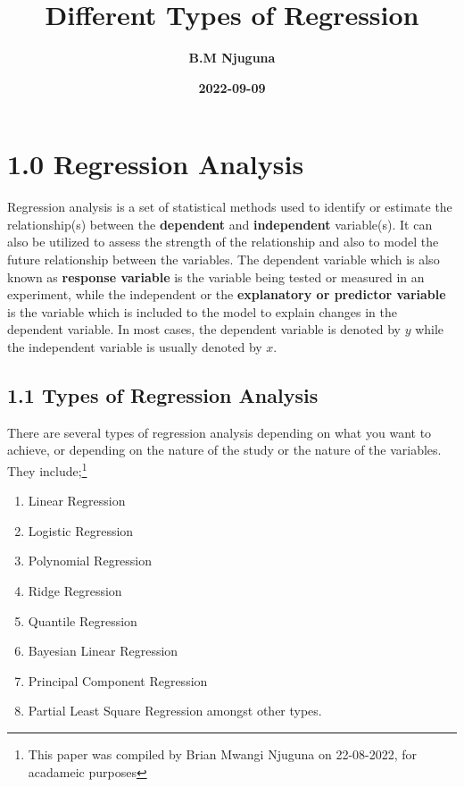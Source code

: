 \documentclass[
]{article}
\title{\textbf{Different Types of Regression}}
\author{\textbf{B.M Njuguna}}
\date{\textbf{2022-09-09}}
\begin{document}
\maketitle

\newpage 
\tableofcontents
\newpage

\hypertarget{regression-analysis}{%
\section{1.0 Regression Analysis}\label{regression-analysis}}

Regression analysis is a set of statistical methods used to identify or
estimate the relationship(s) between the \textbf{dependent} and
\textbf{independent} variable(s). It can also be utilized to assess the
strength of the relationship and also to model the future relationship
between the variables. The dependent variable which is also known as
\textbf{response variable} is the variable being tested or measured in
an experiment, while the independent or the \textbf{explanatory or
predictor variable} is the variable which is included to the model to
explain changes in the dependent variable. In most cases, the dependent
variable is denoted by \(y\) while the independent variable is usually
denoted by \(x\).

\hypertarget{types-of-regression-analysis}{%
\subsection{1.1 Types of Regression
Analysis}\label{types-of-regression-analysis}}

There are several types of regression analysis depending on what you
want to achieve, or depending on the nature of the study or the nature
of the variables. They include;\footnote{ This paper was compiled by
  Brian Mwangi Njuguna on 22-08-2022, for acadameic purposes}

\begin{enumerate}
\def\labelenumi{\arabic{enumi}.}
\item
  Linear Regression
\item
  Logistic Regression
\item
  Polynomial Regression
\item
  Ridge Regression
\item
  Quantile Regression
\item
  Bayesian Linear Regression
\item
  Principal Component Regression
\item
  Partial Least Square Regression amongst other types.
\end{enumerate}
\end{document}
